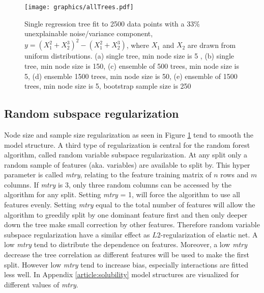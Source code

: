 \begin{figure}[!htbp]
\texttt{[image: graphics/allTrees.pdf]}
\caption{Single regression tree fit to 2500 data points with a 33\% unexplainable noise/variance component, $y=(X_1^2 + X_2^3)^2 - (X_1^2 + X_2^3)$, where $X_1$ and $X_2$ are drawn from uniform distributions. (a) single tree, min node size is 5 , (b) single tree, min node size is 150, (c) ensemble of 500 trees, min node size is 5, (d) ensemble 1500 trees, min node size is 50, (e) ensemble of 1500 trees, min node size is 5, bootstrap sample size is 250}
\label{allTrees}
\end{figure}

\subsection{Random subspace regularization}
Node size and sample size regularization as seen in Figure \ref{allTrees} tend to smooth the model structure. A third type of regularization is central for the random forest algorithm, called random variable subspace regularization. At any split only a random sample of features (aka. variables) are available to split by. This hyper parameter is called \textit{mtry}, relating to the feature training matrix of $n$ rows and $m$ columns. If \textit{mtry} is 3, only three random columns can be accessed by the algorithm for any split. Setting \textit{mtry} = 1, will force the algorithm to use all features evenly. Setting \textit{mtry} equal to the total number of features will allow the algorithm to greedily split by one dominant feature first and then only deeper down the tree make small correction by other features. Therefore random variable subspace regularization have a similar effect as $L2$-regularization of elastic net. A low \textit{mtry} tend to distribute the dependence on features. Moreover, a low \textit{mtry} decrease the tree correlation as different features will be used to make the first split. However low \textit{mtry} tend to increase bias, especially interactions are fitted less well. In Appendix \ref{article:solubility} model structures are visualized for different values of \textit{mtry}.

